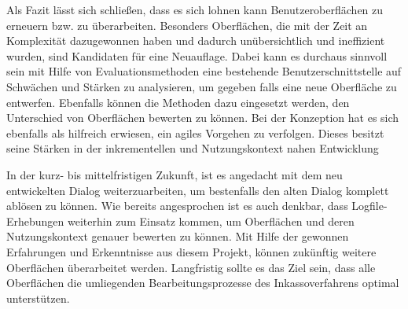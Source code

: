 Als Fazit lässt sich schließen, dass es sich lohnen kann Benutzeroberflächen zu erneuern bzw. zu überarbeiten. Besonders Oberflächen, die mit der Zeit an Komplexität dazugewonnen haben und dadurch unübersichtlich und ineffizient wurden, sind Kandidaten für eine Neuauflage. Dabei kann es durchaus sinnvoll sein mit Hilfe von Evaluationsmethoden eine bestehende Benutzerschnittstelle auf Schwächen und Stärken zu analysieren, um gegeben falls eine neue Oberfläche zu entwerfen. Ebenfalls können die Methoden dazu eingesetzt werden, den Unterschied von Oberflächen bewerten zu können. Bei der Konzeption hat es sich ebenfalls als hilfreich erwiesen, ein agiles Vorgehen zu verfolgen. Dieses besitzt seine Stärken in der inkrementellen und Nutzungskontext nahen Entwicklung 

In der kurz- bis mittelfristigen Zukunft, ist es angedacht mit dem neu entwickelten Dialog weiterzuarbeiten, um bestenfalls den alten Dialog komplett ablösen zu können. Wie bereits angesprochen ist es auch denkbar, dass Logfile-Erhebungen weiterhin zum Einsatz kommen, um Oberflächen und deren Nutzungskontext genauer bewerten zu können. Mit Hilfe der gewonnen Erfahrungen und Erkenntnisse aus diesem Projekt, können zukünftig weitere Oberflächen überarbeitet werden. Langfristig sollte es das Ziel sein, dass alle Oberflächen die umliegenden Bearbeitungsprozesse des Inkassoverfahrens optimal unterstützen.